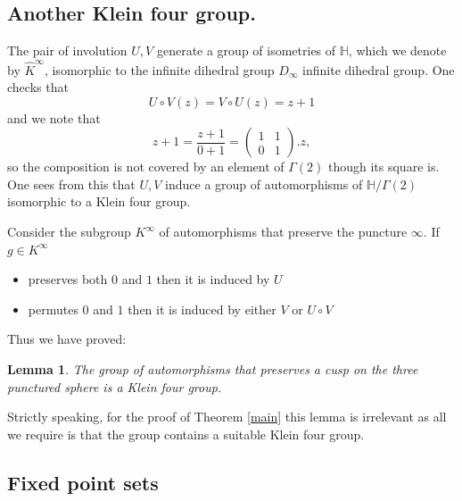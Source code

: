 \documentclass[12pt,a4paper]{amsart}
\newtheorem{lem}[thm]{Lemma}
\def\HH{\mathbb{H}}
\def\xx{\HH/g2}
\def\g2{\Gamma(2)}
\def\xx{\HH/\g2}
\begin{document}
\subsection{Another Klein four group.}

The pair of involution $U,V$ generate a group 
of isometries of $\HH$,  which we denote by $\hat{K}^\infty$, 
 isomorphic to the infinite dihedral group $D_\infty$
infinite dihedral group. One checks that 
$$U\circ V (z) = V \circ U (z) = z + 1$$
and we note that 
$$  z + 1 = \frac{z+ 1}{ 0 + 1} = \begin{pmatrix}
1 & 1 \\ 0 & 1
\end{pmatrix}. z,$$
so the composition is not covered  by an element of $\g2$ though its square is.
One sees  from this that 
$U,V$ induce a  group of automorphisms of $\xx$ isomorphic to  a Klein four group.

Consider the subgroup $K^\infty$ of automorphisms that 
preserve the puncture $\infty$.
 If $g\in K^\infty$
\begin{itemize}
\item  preserves both  $0$ and $ 1$ then it is induced by $U$
\item  permutes  $0$ and $ 1$ then it is induced by either  $V$  or $U\circ V$
\end{itemize}

Thus we have proved:

\begin{lem}
The group of automorphisms that preserves a cusp 
on the three punctured sphere is a Klein four group.
\end{lem}

Strictly speaking, for the proof of Theorem \ref{main} this lemma is irrelevant 
as all we require is that the group contains a suitable Klein four group.


\subsection{Fixed point sets }
\end{document}
